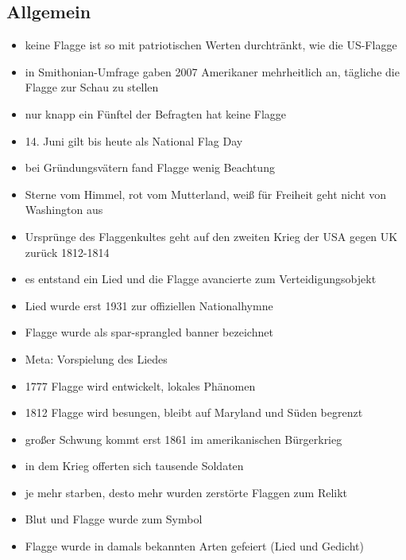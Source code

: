 \documentclass[10pt,a4paper,oneside,ngerman,numbers=noenddot]{scrartcl}
\newenvironment{myitemize}{\begin{itemize}\itemsep -8pt}{\end{itemize}} %
\begin{document}
\subsection*{Allgemein}
\begin{myitemize}
    \item keine Flagge ist so mit patriotischen Werten durchtränkt, wie die US-Flagge
    \item in Smithonian-Umfrage gaben 2007 Amerikaner mehrheitlich an, tägliche die Flagge zur Schau zu stellen
    \item nur knapp ein Fünftel der Befragten hat keine Flagge
    \item 14. Juni gilt bis heute als National Flag Day
    \item bei Gründungsvätern fand Flagge wenig Beachtung
    \item Sterne vom Himmel, rot vom Mutterland, weiß für Freiheit geht nicht von Washington aus
    \item Ursprünge des Flaggenkultes geht auf den zweiten Krieg der USA gegen UK zurück 1812-1814
    \item es entstand ein Lied und die Flagge avancierte zum Verteidigungsobjekt
    \item Lied wurde erst 1931 zur offiziellen Nationalhymne
    \item Flagge wurde als spar-sprangled banner bezeichnet
    \item Meta: Vorspielung des Liedes
    \item 1777 Flagge wird entwickelt, lokales Phänomen
    \item 1812 Flagge wird besungen, bleibt auf Maryland und Süden begrenzt
    \item großer Schwung kommt erst 1861 im amerikanischen Bürgerkrieg
    \item in dem Krieg offerten sich tausende Soldaten
    \item je mehr starben, desto mehr wurden zerstörte Flaggen zum Relikt
    \item Blut und Flagge wurde zum Symbol
    \item Flagge wurde in damals bekannten Arten gefeiert (Lied und Gedicht)
\end{myitemize}
\end{document}
